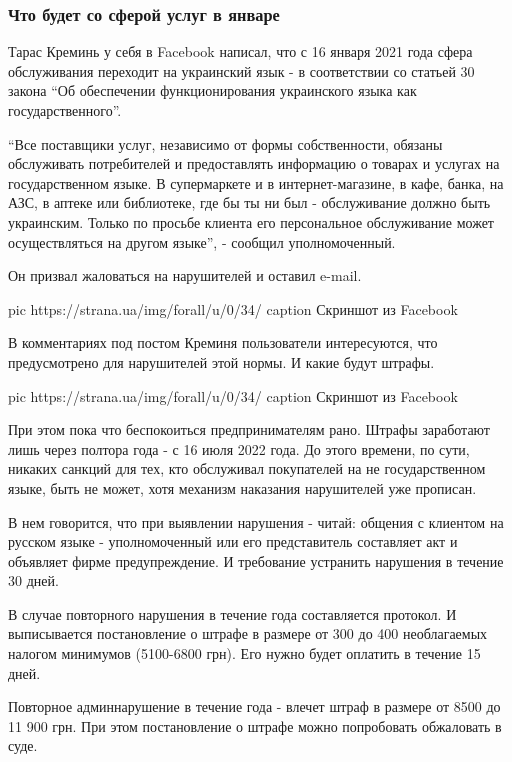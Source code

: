  
 
 
 
 

\subsubsection{Что будет со сферой услуг в январе}

Тарас Креминь у себя в Facebook написал, что с 16 января 2021 года сфера
обслуживания переходит на украинский язык - в соответствии со статьей 30 закона
\enquote{Об обеспечении функционирования украинского языка как государственного}. 

\enquote{Все поставщики услуг, независимо от формы собственности, обязаны
обслуживать потребителей и предоставлять информацию о товарах и услугах на
государственном языке. В супермаркете и в интернет-магазине, в кафе, банка, на
АЗС, в аптеке или библиотеке, где бы ты ни был - обслуживание должно быть
украинским. Только по просьбе клиента его персональное обслуживание может
осуществляться на другом языке}, - сообщил уполномоченный. 

Он призвал жаловаться на нарушителей и оставил e-mail.

\ifcmt
pic https://strana.ua/img/forall/u/0/34/%
caption Скриншот из Facebook
\fi

В комментариях под постом Креминя пользователи интересуются, что предусмотрено
для нарушителей этой нормы. И какие будут штрафы. 

\ifcmt
pic https://strana.ua/img/forall/u/0/34/%
caption Скриншот из Facebook
\fi

При этом пока что беспокоиться предпринимателям рано. Штрафы заработают лишь
через полтора года - с 16 июля 2022 года. До этого времени, по сути, никаких
санкций для тех, кто обслуживал покупателей на не государственном языке, быть
не может, хотя механизм наказания нарушителей уже прописан. 

В нем говорится, что при выявлении нарушения - читай: общения с клиентом на
русском языке - уполномоченный или его представитель составляет акт и объявляет
фирме предупреждение. И требование устранить нарушения в течение 30 дней. 

В случае повторного нарушения в течение года составляется протокол. И
выписывается постановление о штрафе в размере от 300 до 400 необлагаемых
налогом минимумов (5100-6800 грн). Его нужно будет оплатить в течение 15 дней.

Повторное админнарушение в течение года - влечет штраф в размере от 8500 до 11
900 грн. При этом постановление о штрафе можно попробовать обжаловать в суде. 

